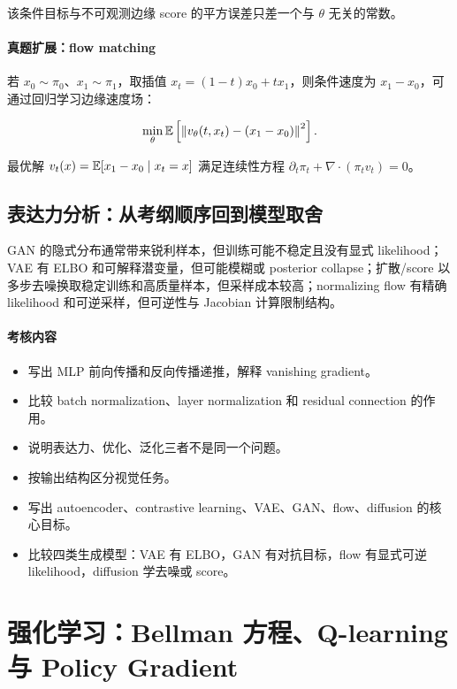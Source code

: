 该条件目标与不可观测边缘 score 的平方误差只差一个与 \(\theta\) 无关的常数。

\paragraph{真题扩展：flow matching}

若 \(x_0\sim\pi_0\)、\(x_1\sim\pi_1\)，取插值 \(x_t=(1-t)x_0+tx_1\)，则条件速度为 \(x_1-x_0\)，可通过回归学习边缘速度场：

\[
  \min_\theta\mathbb{E}\left[\left\|v_\theta(t,x_t)-(x_1-x_0)\right\|^2\right].
\]

最优解 \(v_t(x)=\mathbb{E}[x_1-x_0\mid x_t=x]\) 满足连续性方程 \(\partial_t\pi_t+\nabla\cdot(\pi_t v_t)=0\)。

\subsection{表达力分析：从考纲顺序回到模型取舍}

GAN 的隐式分布通常带来锐利样本，但训练可能不稳定且没有显式 likelihood；VAE 有 ELBO 和可解释潜变量，但可能模糊或 posterior collapse；扩散/score 以多步去噪换取稳定训练和高质量样本，但采样成本较高；normalizing flow 有精确 likelihood 和可逆采样，但可逆性与 Jacobian 计算限制结构。

\paragraph{考核内容}

\begin{itemize}
  \item 写出 MLP 前向传播和反向传播递推，解释 vanishing gradient。
  \item 比较 batch normalization、layer normalization 和 residual connection 的作用。
  \item 说明表达力、优化、泛化三者不是同一个问题。
  \item 按输出结构区分视觉任务。
  \item 写出 autoencoder、contrastive learning、VAE、GAN、flow、diffusion 的核心目标。
  \item 比较四类生成模型：VAE 有 ELBO，GAN 有对抗目标，flow 有显式可逆 likelihood，diffusion 学去噪或 score。
\end{itemize}

\section{强化学习：Bellman 方程、Q-learning 与 Policy Gradient}

